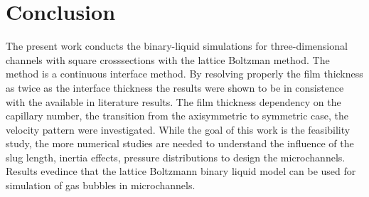 \documentclass{article}
\begin{document}

\section{Conclusion}
The present work conducts the binary-liquid simulations for three-dimensional channels with square
crosssections with the lattice Boltzman method. The
method is a continuous interface method. By resolving properly the film thickness as twice as the
interface thickness \cite{kuzmin-binary2d} the results were shown to be in consistence with the
available in literature results. The film thickness dependency on the capillary number, the
transition from the axisymmetric to symmetric case, the velocity pattern were investigated. While
the goal of this work is the feasibility study, the more numerical studies are needed to
understand the influence of the slug length, inertia effects, pressure distributions
\cite{kreutzer-taylor,yue-mass} to design the microchannels. Results evedince that the lattice
Boltzmann binary liquid model can be used for simulation of gas bubbles in microchannels. 

\appendix
\end{document}
